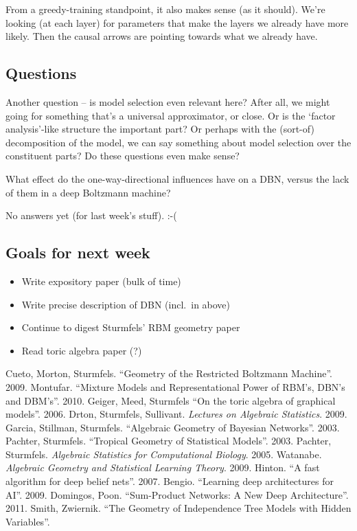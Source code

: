 \documentclass[11pt]{article}
\begin{document}
From a greedy-training standpoint, it also makes sense (as it should).  We're
looking (at each layer) for parameters that make the layers we already have more
likely.  Then the causal arrows are pointing towards what we already have.

\subsection{Questions}

Another question -- is model selection even relevant here?  After all, we might
going for something that's a universal approximator, or close.  Or is the
`factor analysis'-like structure the important part?  Or perhaps with the
(sort-of) decomposition of the model, we can say something about model selection
over the constituent parts?  Do these questions even make sense?

What effect do the one-way-directional influences have on a DBN, versus the lack
of them in a deep Boltzmann machine?

No answers yet (for last week's stuff). :-(


\subsection{Goals for next week}
\begin{itemize}
\item Write expository paper (bulk of time)
\item Write precise description of DBN (incl.\ in above)
\item Continue to digest Sturmfels' RBM geometry paper
\item Read toric algebra paper (?)
\end{itemize}


\begin{thebibliography}{100}
     Cueto, Morton, Sturmfels. ``Geometry of the Restricted
    Boltzmann Machine''.  2009.
     Montufar.  ``Mixture Models and Representational Power of
    RBM's, DBN's and DBM's''.  2010.
     Geiger, Meed, Sturmfels ``On the toric algebra of graphical
    models''. 2006.
     Drton, Sturmfels, Sullivant. \textit{Lectures on Algebraic
    Statistics}. 2009.
     Garcia, Stillman, Sturmfels.  ``Algebraic Geometry of Bayesian
    Networks''.  2003.
     Pachter, Sturmfels.  ``Tropical Geometry of Statistical
    Models''. 2003.
     Pachter, Sturmfels.  \textit{Algebraic Statistics for
    Computational Biology}.  2005.
     Watanabe.  \textit{Algebraic Geometry and Statistical Learning
    Theory}.  2009.
     Hinton.  ``A fast algorithm for deep belief nets''.  2007.
     Bengio.  ``Learning deep architectures for AI''. 2009.
     Domingos, Poon. ``Sum-Product Networks: A New Deep
    Architecture''. 2011.
     Smith, Zwiernik.  ``The Geometry of Independence Tree Models
    with Hidden Variables''.
\end{thebibliography}
\end{document}
